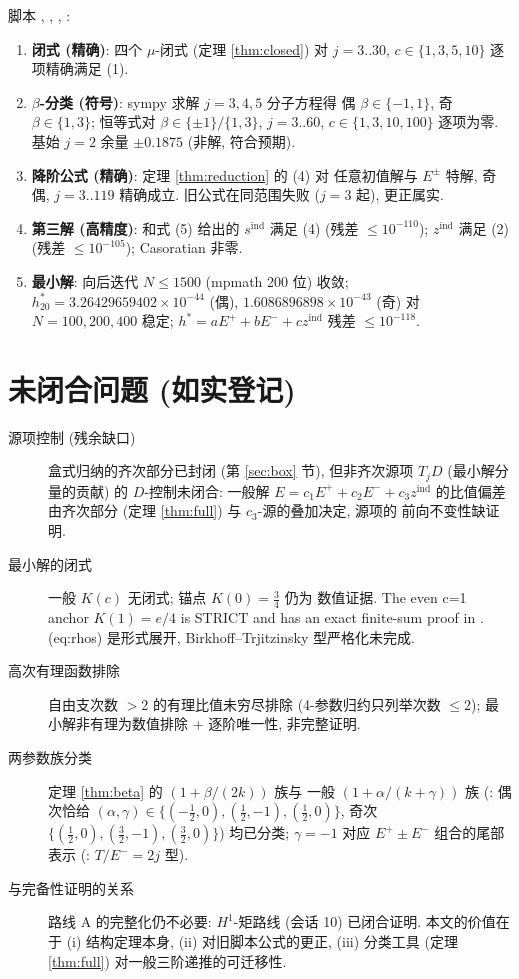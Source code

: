 \documentclass[UTF8]{ctexart}
\begin{document}
脚本 , ,
, :
\begin{enumerate}
	\item \textbf{闭式 (精确)}: 四个 $\mu$-闭式 (定理 \ref{thm:closed}) 对
		$j = 3..30$, $c \in \{1,3,5,10\}$ 逐项精确满足 (1).
	\item \textbf{$\beta$-分类 (符号)}: sympy 求解 $j = 3,4,5$ 分子方程得
		偶 $\beta \in \{-1,1\}$, 奇 $\beta \in \{1,3\}$; 恒等式对
		$\beta \in \{\pm 1\}/\{1,3\}$, $j = 3..60$, $c \in \{1,3,10,100\}$
		逐项为零. 基始 $j=2$ 余量 $\pm 0.1875$ (非解, 符合预期).
	\item \textbf{降阶公式 (精确)}: 定理 \ref{thm:reduction} 的 (4) 对
		任意初值解与 $E^\pm$ 特解, 奇偶, $j = 3..119$ 精确成立.
		旧公式在同范围失败 ($j=3$ 起), 更正属实.
	\item \textbf{第三解 (高精度)}: 和式 (5) 给出的 $s^{\mathrm{ind}}$ 满足 (4)
		(残差 $\leq 10^{-110}$); $z^{\mathrm{ind}}$ 满足 (2) (残差
		$\leq 10^{-105}$); Casoratian 非零.
	\item \textbf{最小解}: 向后迭代 $N \leq 1500$ (mpmath 200 位) 收敛;
		$h^*_{20} = 3.26429659402\times10^{-44}$ (偶), $1.6086896898\times10^{-43}$
		(奇) 对 $N = 100,200,400$ 稳定; $h^* = aE^+ + bE^- + c z^{\mathrm{ind}}$
		残差 $\leq 10^{-118}$.
\end{enumerate}

\section{未闭合问题 (如实登记)}

\begin{description}
	\item[源项控制 (残余缺口)] 盒式归纳的齐次部分已封闭 (第 \ref{sec:box} 节),
		但非齐次源项 $T_j D$ (最小解分量的贡献) 的 $D$-控制未闭合:
		一般解 $E = c_1E^+ + c_2E^- + c_3 z^{\mathrm{ind}}$ 的比值偏差
		由齐次部分 (定理 \ref{thm:full}) 与 $c_3$-源的叠加决定, 源项的
		前向不变性缺证明.
	\item[最小解的闭式] 一般 $K(c)$ 无闭式; 锚点 $K(0) = \tfrac34$ 仍为
		数值证据. The even c=1 anchor $K(1)=e/4$ is STRICT and has an exact
		finite-sum proof in . (eq:rhos) 是形式展开,
		Birkhoff--Trjitzinsky 型严格化未完成.
	\item[高次有理函数排除] 自由支次数 $> 2$ 的有理比值未穷尽排除
		(4-参数归约只列举次数 $\leq 2$); 最小解非有理为数值排除 +
		逐阶唯一性, 非完整证明.
	\item[两参数族分类] 定理 \ref{thm:beta} 的 $(1+\beta/(2k))$ 族与
		一般 $(1+\alpha/(k+\gamma))$ 族 (:
		偶次恰给 $(\alpha,\gamma) \in \{(-\tfrac12,0),(\tfrac12,-1),(\tfrac12,0)\}$,
		奇次 $\{(\tfrac12,0),(\tfrac32,-1),(\tfrac32,0)\}$) 均已分类;
		$\gamma = -1$ 对应 $E^+ \pm E^-$ 组合的尾部表示
		(: $T/E^- = 2j$ 型).
	\item[与完备性证明的关系] 路线 A 的完整化仍不必要: $H^1$-矩路线 (会话 10)
		已闭合证明. 本文的价值在于 (i) 结构定理本身, (ii) 对旧脚本公式的更正,
		(iii) 分类工具 (定理 \ref{thm:full}) 对一般三阶递推的可迁移性.
\end{description}
\end{document}
